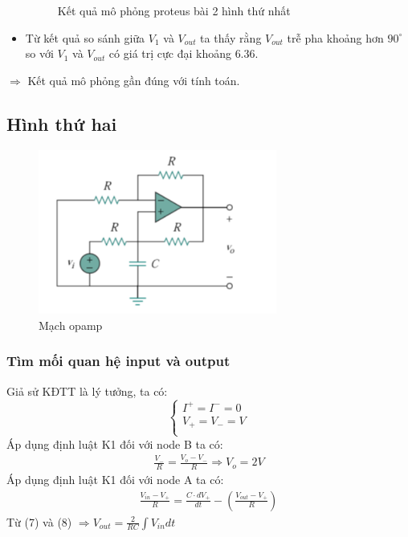 \begin{itemize}
\begin{figure}[H]
                    \caption{Kết quả mô phỏng proteus bài 2 hình thứ nhất}
                \end{figure}
                \item Từ kết quả so sánh giữa $V_{1}$ và $V_{out}$ ta thấy rằng $V_{out}$ trễ pha khoảng hơn $90^\circ$ so với $V_{1}$ và $V_{out}$ có giá trị cực đại khoảng $6.36$.
            \end{itemize}
            \hspace*{0.6cm}$\Rightarrow$ Kết quả mô phỏng gần đúng với tính toán.
    \subsection{Hình thứ hai}
        \begin{figure}[H]
            \centering
            \includegraphics[width=0.7\textwidth]{pictures/topic2_b.png}
            \caption{Mạch opamp}					
            \label{fig:circuit_simulation}
        \end{figure}
        \subsubsection{Tìm mối quan hệ input và output}
            \hspace*{0.6cm}Giả sử KĐTT là lý tưởng, ta có:
            \[
				\begin{cases}
					I^+ = I^- = 0\\
					V_{+} = V_{-} = V\\
				\end{cases}
			\]
            \hspace*{0.6cm}Áp dụng định luật K1 đối với node B ta có: 
            \begin{align}
                \frac{V_{-}}{R} = \frac{V_{o} - V_{-}}{R} \Rightarrow V_{o}= 2V
            \end{align}
            \hspace*{0.6cm}Áp dụng định luật K1 đối với node A ta có:
            \begin{align}
                \frac{V_{in} - V_{+}}{R} = \frac{C \cdot dV_{+}}{dt} - (\frac{V_{out} - V_{+}}{R}) 
            \end{align}
            \hspace{0.6cm}Từ (7) và (8) $\Rightarrow V_{out} = \frac{2}{RC} \int V_{in} dt$ \\
